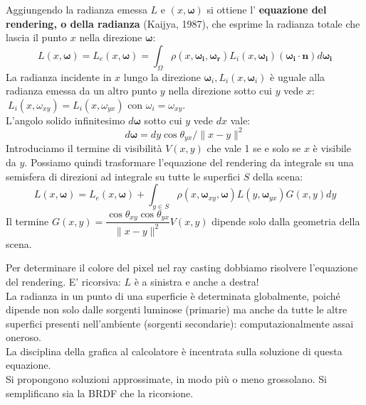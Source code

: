 \documentclass[a4paper, 10pt]{article}
\renewcommand{\vec}{\bm}
\begin{document}
		Aggiungendo la radianza emessa $ L $ e $ (x, \vec{\omega}) $ si ottiene l'
		\textbf{equazione del rendering, o della radianza} (Kaijya, 1987), che
		esprime la radianza totale che lascia il punto $ x $ nella direzione $ \vec{\omega} $:
		\[
			\boxed{L(x, \vec{\omega}) = L_e(x, \vec{\omega}) = 
			 \int_{\Omega} \rho(x, \vec{\omega_i}, \vec{\omega_r}) 
			L_i (x, \vec{\omega_i} )(\vec{\omega_i} \cdot \vec{n}) d\vec{\omega_i}}
		\]
		La radianza incidente in $ x $ lungo la direzione 
		$ \vec{\omega}_i , L_i (x, \vec{\omega}_i) $ è uguale alla radianza emessa da un altro punto $ y $ nella direzione sotto cui $ y $ vede $ x $: 
		$\: L_i (x, \omega_{xy} )= L_i(x, \omega_{yx} ) $ con $ \omega_i = \omega_{xy} $.\\
		L’angolo solido infinitesimo $ d \vec{\omega} $ sotto cui $ y $ vede $ dx $ vale:
		\[
			d\vec{\omega} = dy \cos\theta_{yx} / \|x-y\|^2
		\]
		Introduciamo il termine di visibilità $ V(x,y) $ che vale 1 se e
		solo se $ x $ è visibile da $ y $. Possiamo quindi trasformare
		l’equazione del rendering da integrale su una semisfera di
		direzioni ad integrale su tutte le superfici $ S $ della scena:
		\[
			L(x, \vec{\omega}) = L_e(x, \vec{\omega}) + \int_{y \in S} \rho(x, \vec{\omega}_{xy}, \vec{\omega}) L(y, \vec{\omega}_{yx}) G(x, y) dy 
		\]
		Il termine $ G(x, y) = \dfrac{\cos\theta_{xy}\cos\theta_{yx}}{\| x-y \|^2}V(x,y) $
		dipende solo dalla geometria della scena.
		
		\bigskip
		\noindent
		Per determinare il colore del pixel nel ray casting dobbiamo risolvere l'equazione del rendering. E' ricorsiva: $ L $ è a sinistra e anche a destra!\\
		La radianza in un punto di una superficie è determinata
		globalmente, poiché dipende non solo dalle sorgenti luminose
		(primarie) ma anche da tutte le altre superfici presenti nell’ambiente
		(sorgenti secondarie): computazionalmente assai oneroso.\\
		La disciplina della grafica al calcolatore è incentrata sulla
		soluzione di questa equazione.\\
		Si propongono soluzioni approssimate, in modo più o meno
		grossolano. Si semplificano sia la BRDF che la ricorsione.\\
		
\end{document}
